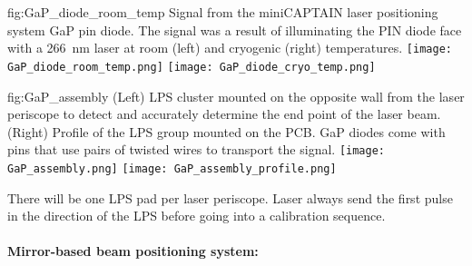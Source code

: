 

\begin{dunefigure}{fig:GaP_diode_room_temp}
{Signal from the miniCAPTAIN laser positioning system GaP pin diode. The signal was a result of illuminating the PIN diode face with a \SI{266}{\nano\m} laser at room (left) and cryogenic (right) temperatures.}
\texttt{[image: GaP\_diode\_room\_temp.png]} 
\texttt{[image: GaP\_diode\_cryo\_temp.png]} 
\end{dunefigure}



\begin{dunefigure}{fig:GaP_assembly}
{(Left) LPS cluster mounted on the opposite wall from the laser periscope to detect and accurately determine the end point of the laser beam. (Right)
Profile of the LPS group mounted on the PCB. GaP diodes come with pins that use pairs of twisted wires to transport the signal.
}
\texttt{[image: GaP\_assembly.png]} 
\texttt{[image: GaP\_assembly\_profile.png]} 
\end{dunefigure}


There will be one LPS pad per laser periscope. Laser always send the first pulse in the direction of the LPS before going into a calibration sequence. 


\paragraph{Mirror-based beam positioning system:}

